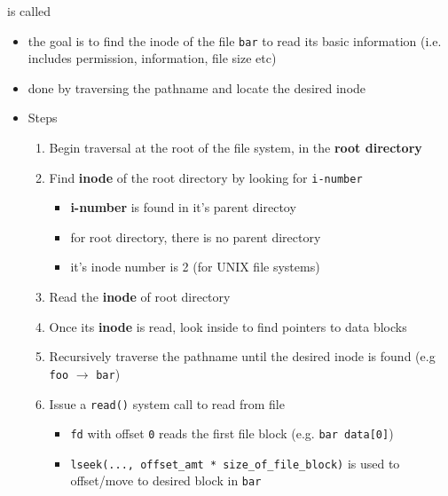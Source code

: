 \documentclass[12pt]{article}
\begin{document}
\begin{itemize}
    \bigskip

    is called

    \bigskip

    \begin{itemize}
        \item the goal is to find the inode of the file \texttt{bar} to read its basic information
        (i.e. includes permission, information, file size etc)
        \item done by traversing the pathname and locate the desired inode
        \item Steps

        \begin{enumerate}[1.]
            \item Begin traversal at the root of the file system, in the \textbf{root directory}

            \item Find \textbf{inode} of the root directory by looking for \texttt{i-number}

            \begin{itemize}
                \item \textbf{i-number} is found in it's parent directoy
                \item for root directory, there is no parent directory
                \item it's inode number is 2 (for UNIX file systems)
            \end{itemize}

            \item Read the \textbf{inode} of root directory
            \item Once its \textbf{inode} is read, look inside to find pointers
            to data blocks
            \item Recursively traverse the pathname until the desired inode is found (e.g \texttt{foo} $\to$ \texttt{bar})
            \item Issue a \texttt{read()} system call to read from file

            \begin{itemize}
                \item \texttt{fd} with offset \texttt{0} reads the first file block (e.g. \texttt{bar data[0]})
                \item \texttt{lseek(..., offset\_amt * size\_of\_file\_block)} is used to offset/move to desired block in \texttt{bar}
            \end{itemize}


\end{enumerate}
\end{itemize}
\end{itemize}
\end{document}
